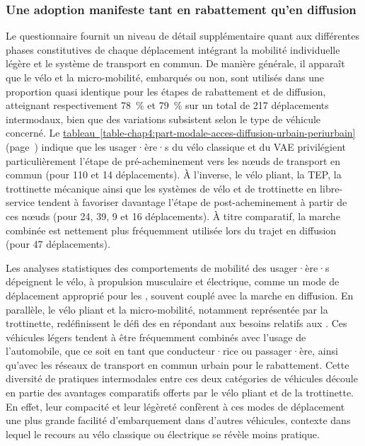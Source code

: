\begin{refsegment}
\subsubsection*{Une adoption manifeste tant en rabattement qu'en diffusion
    \label{chap4:rabattement-diffusion}
    }

Le questionnaire fournit un niveau de détail supplémentaire quant aux différentes phases constitutives de chaque déplacement intégrant la mobilité individuelle légère et le système de transport en commun. De manière générale, il apparaît que le vélo et la micro-mobilité, embarqués ou non, sont utilisés dans une proportion quasi identique pour les étapes de rabattement et de diffusion, atteignant respectivement 78~\% et 79~\% sur un total de 217 déplacements intermodaux, bien que des variations subsistent selon le type de véhicule concerné. Le \hyperref[table-chap4:part-modale-acces-diffusion-urbain-periurbain]{tableau~\ref{table-chap4:part-modale-acces-diffusion-urbain-periurbain}} (page~\pageref{table-chap4:part-modale-acces-diffusion-urbain-periurbain}) indique que les usager·ère·s du vélo classique et du \acrshort{VAE} privilégient particulièrement l'étape de pré-acheminement vers les nœuds de transport en commun (pour 110 et 14 déplacements). À l'inverse, le vélo pliant, la \acrshort{TEP}, la trottinette mécanique ainsi que les systèmes de vélo et de trottinette en libre-service tendent à favoriser davantage l'étape de post-acheminement à partir de ces nœuds (pour 24, 39, 9 et 16 déplacements). À titre comparatif, la marche combinée est nettement plus fréquemment utilisée lors du trajet en diffusion (pour 47 déplacements).%

Les analyses statistiques des comportements de mobilité des usager·ère·s dépeignent le vélo, à propulsion musculaire et électrique, comme un mode de déplacement approprié pour les , souvent couplé avec la marche en diffusion. En parallèle, le vélo pliant et la micro-mobilité, notamment représentée par la trottinette, redéfinissent le défi des  en répondant aux besoins relatifs aux . Ces véhicules légers tendent à être fréquemment combinés avec l'usage de l'automobile, que ce soit en tant que conducteur·rice ou passager·ère, ainsi qu'avec les réseaux de transport en commun urbain pour le rabattement. Cette diversité de pratiques intermodales entre ces deux catégories de véhicules découle en partie des avantages comparatifs offerts par le vélo pliant et de la trottinette. En effet, leur compacité et leur légèreté confèrent à ces modes de déplacement une plus grande facilité d'embarquement dans d'autres véhicules, contexte dans lequel le recours au vélo classique ou électrique se révèle moins pratique.%


\end{refsegment}
